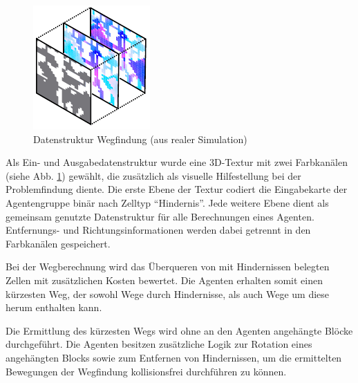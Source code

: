 \documentclass[runningheads]{llncs}
\begin{document}
\begin{figure}
\includegraphics{./Referenzen/Pathfinding.pdf}
\caption{Datenstruktur Wegfindung (aus realer Simulation)}
\label{pathfinding}
\end{figure}
Als Ein- und Ausgabedatenstruktur wurde eine 3D-Textur mit zwei Farbkanälen (siehe Abb. \ref{pathfinding}) gewählt, die zusätzlich als visuelle Hilfestellung bei der Problemfindung diente. Die erste Ebene der Textur codiert die Eingabekarte der Agentengruppe binär nach Zelltyp "`Hindernis"'. Jede weitere Ebene dient als gemeinsam genutzte Datenstruktur für alle Berechnungen eines Agenten. Entfernungs- und Richtungsinformationen werden dabei getrennt in den Farbkanälen gespeichert.

Bei der Wegberechnung wird das Überqueren von mit Hindernissen belegten Zellen mit zusätzlichen Kosten bewertet. Die Agenten erhalten somit einen kürzesten Weg, der sowohl Wege durch Hindernisse, als auch Wege um diese herum enthalten kann.

Die Ermittlung des kürzesten Wegs wird ohne an den Agenten angehängte Blöcke durchgeführt. Die Agenten besitzen zusätzliche Logik zur Rotation eines angehängten Blocks sowie zum Entfernen von Hindernissen, um die ermittelten Bewegungen der Wegfindung kollisionsfrei durchführen zu können.
\end{document}
